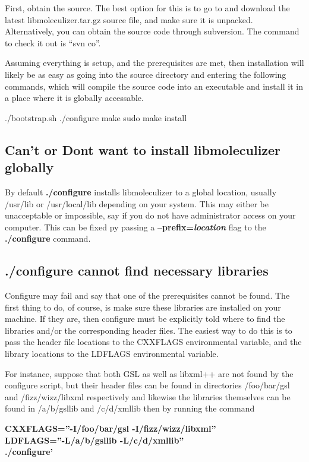 First, obtain the source.  The best option for this is to go to
\libmzrwebsite and download the latest libmoleculizer.tar.gz source
file, and make sure it is unpacked.  Alternatively, you can obtain the
source code through subversion.  The command to check it out is ``svn
co''.

Assuming everything is setup, and the prerequisites are met, then
installation will likely be as easy as going into the source directory
and entering the following commands, which will compile the source
code into an executable and install it in a place where it is
globally accessable.  

\begin{Shell}
./bootstrap.sh
./configure
make
sudo make install
\end{Shell}

\subsection{Can't or Dont want to install libmoleculizer globally}
By default {\bf ./configure} installs libmoleculizer to a global
location, usually /usr/lib or /usr/local/lib depending on your
system.  This may either be unacceptable or impossible, say if you do
not have administrator access on your computer.  This can be fixed py
passing a {\bf --prefix=\emph{location}} flag to the {\bf ./configure}
command.  

\subsection{./configure cannot find necessary libraries}
Configure may fail and say that one of the prerequisites cannot be
found.  The first thing to do, of course, is make sure these libraries
are installed on your machine.  If they are, then configure must be
explicitly told where to find the libraries and/or the corresponding
header files. The easiest way to do this is to pass the header file
locations to the CXXFLAGS environmental variable, and the library
locations to the LDFLAGS environmental variable.  

For instance, suppose that both GSL as well as libxml++ are not found
by the configure script, but their header files can be found in
directories /foo/bar/gsl and /fizz/wizz/libxml respectively and
likewise the libraries themselves can be found in /a/b/gsllib and
/c/d/xmllib then by running the command 

{\bf CXXFLAGS=''-I/foo/bar/gsl
  -I/fizz/wizz/libxml'' \\
LDFLAGS=''-L/a/b/gsllib -L/c/d/xmllib'' \\
  ./configure'} 

